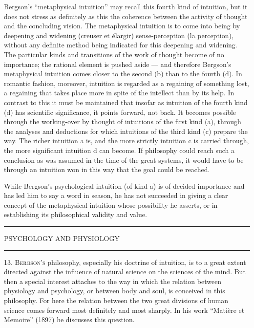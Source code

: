 \documentclass[12pt,a4paper,openany]{book}
\newcommand{\opage}[1]{\marginnote{\footnotesize\textit{[#1]}}}
\newcommand{\chapterhead}[1]{\clearpage\phantomsection\addcontentsline{toc}{chapter}{#1}\vspace*{3cm}\begin{center}{\large #1}\\[6pt]\rule{1.2cm}{0.4pt}\end{center}\medskip}
\newcommand{\initial}[2]{{\Large #1}\textsc{#2}}
\newcommand{\chapterend}{\par\begin{center}\rule{2.5cm}{0.4pt}\end{center}}
\begin{document}
Bergson's ``metaphysical intuition'' may recall this fourth kind of intuition, but it does not stress as definitely as this the coherence between the activity of thought and the concluding vision. The metaphysical intuition is to come into being by deepening and widening (creuser et élargir) sense-perception (la perception), without any definite method being indicated for this deepening and widening. The particular kinds and transitions of the work of thought become of no importance; the rational element is pushed aside --- and therefore Bergson's metaphysical intuition comes closer to the second (b) than to the fourth (d). In romantic fashion, moreover, intuition is regarded as a regaining of something lost, a regaining that takes place more in spite of the intellect than by its help. In contrast to this it must be maintained that insofar as intuition of the fourth kind (d) has scientific significance, it points forward, not back. It becomes possible through the working-over by thought of intuitions of the first kind (a), through the analyses and deductions for which intuitions of the third kind (c) prepare the way. The richer intuition a is, and the more strictly
\opage{26}intuition c is carried through, the more significant intuition d can become. If philosophy could reach such a conclusion as was assumed in the time of the great systems, it would have to be through an intuition won in this way that the goal could be reached.

While Bergson's psychological intuition (of kind a) is of decided importance and has led him to say a word in season, he has not succeeded in giving a clear concept of the metaphysical intuition whose possibility he asserts, or in establishing its philosophical validity and value.

\chapterend

\chapterhead{PSYCHOLOGY AND PHYSIOLOGY}

\opage{27}13. \initial{B}{ergson's} philosophy, especially his doctrine of intuition, is to a great extent directed against the influence of natural science on the sciences of the mind. But then a special interest attaches to the way in which the relation between physiology and psychology, or between body and soul, is conceived in this philosophy. For here the relation between the two great divisions of human science comes forward most definitely and most sharply. In his work ``Matière et Memoire'' %
(1897) he discusses this question.
\end{document}

